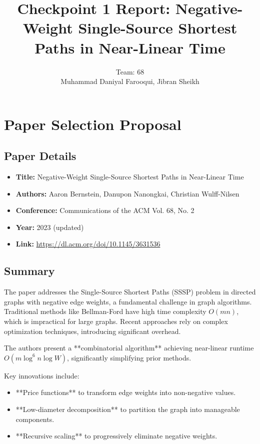 \documentclass{article}
\title{Checkpoint 1 Report: Negative-Weight Single-Source Shortest Paths in Near-Linear Time}
\author{Team: 68 \\
Muhammad Daniyal Farooqui, Jibran Sheikh}
\begin{document}
\maketitle

\section{Paper Selection Proposal}

\subsection{Paper Details}

\begin{itemize}
    \item \textbf{Title:} Negative-Weight Single-Source Shortest Paths in Near-Linear Time
    \item \textbf{Authors:} Aaron Bernstein, Danupon Nanongkai, Christian Wulff-Nilsen
    \item \textbf{Conference:} Communications of the ACM Vol. 68, No. 2
    \item \textbf{Year:} 2023 (updated)
    \item \textbf{Link:} \url{https://dl.acm.org/doi/10.1145/3631536}
\end{itemize}

\subsection{Summary}

The paper addresses the Single-Source Shortest Paths (SSSP) problem in directed graphs with negative edge weights, a fundamental challenge in graph algorithms. Traditional methods like Bellman-Ford have high time complexity \( O(mn) \), which is impractical for large graphs. Recent approaches rely on complex optimization techniques, introducing significant overhead. 

The authors present a **combinatorial algorithm** achieving near-linear runtime \( O(m \log^6 n \log W) \), significantly simplifying prior methods. 

Key innovations include:
\begin{itemize}
    \item **Price functions** to transform edge weights into non-negative values.
    \item **Low-diameter decomposition** to partition the graph into manageable components.
    \item **Recursive scaling** to progressively eliminate negative weights.
\end{itemize}
\end{document}
